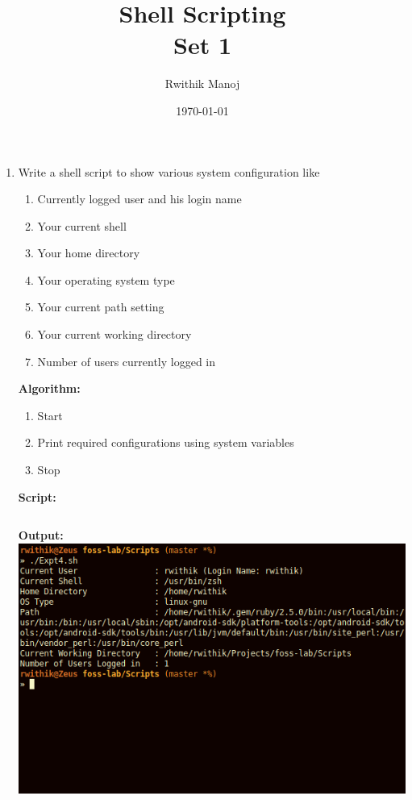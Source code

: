 \documentclass[10pt,a4paper,titlepage]{report}
\begin{document}
\begin{titlepage}
\author{Rwithik Manoj}
\title{Shell Scripting\\Set 1}
\date{\today}
\maketitle
\end{titlepage}
\nonstopmode
\begin{enumerate}
\item Write a shell script to show various system configuration like
\begin{enumerate}
\item Currently logged user and his login name
\item Your current shell
\item Your home directory
\item Your operating system type
\item Your current path setting
\item Your current working directory
\item Number of users currently logged in
\end{enumerate}
\textbf{Algorithm:}
\begin{enumerate}
	\item Start
	\item Print required configurations using system variables
	\item Stop
\end{enumerate}
\textbf{Script:}\newline
\inputminted{bash}{../Scripts/Set1/Expt4.sh}
\textbf{Output:}\newline 
\newline
\includegraphics[width=\linewidth]{../Images/Shell1/1.png}

\end{enumerate}
\end{document}
